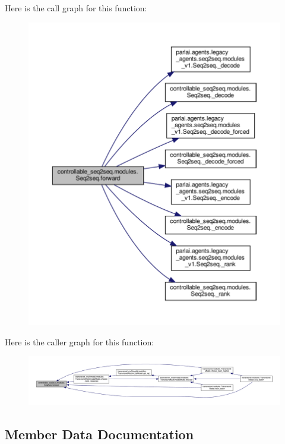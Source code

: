 Here is the call graph for this function\+:
\nopagebreak
\begin{figure}[H]
\begin{center}
\leavevmode
\includegraphics[width=350pt]{classcontrollable__seq2seq_1_1modules_1_1Seq2seq_a024903e38d40e82ab471528d94afcd5c_cgraph}
\end{center}
\end{figure}
Here is the caller graph for this function\+:
\nopagebreak
\begin{figure}[H]
\begin{center}
\leavevmode
\includegraphics[width=350pt]{classcontrollable__seq2seq_1_1modules_1_1Seq2seq_a024903e38d40e82ab471528d94afcd5c_icgraph}
\end{center}
\end{figure}


\subsection{Member Data Documentation}
\mbox{\label{classcontrollable__seq2seq_1_1modules_1_1Seq2seq_aa7b91aeeac7dd5a42118ef75c61b02df}} 
